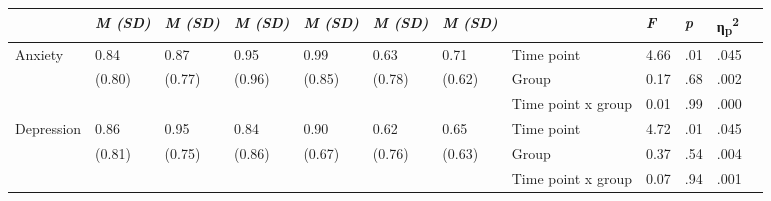\documentclass[authordate, empirical]{jote-new-article}
\begin{document}
\begin{table}[th!]
\begin{fullwidth}
{\begin{tabular}{@{} l l l l l l l | l l l l l @{}}
        \hline                                         & \emph{M (SD)}                                 & \emph{M (SD)}        & \emph{M (SD)}        & \emph{M (SD)} & \emph{M (SD)}
                                                       & \emph{M (SD)}                                 &                      & \emph{F}             & \emph{p}      & η\textsubscript{p}\textsuperscript{2}
        \\

        \hline   Anxiety                               & 0.84                                          & 0.87                 & 0.95                 & 0.99          & 0.63                                  & 0.71   & Time point         & 4.66 & .01  & .045 \\
                                                       & (0.80)                                        & (0.77)               & (0.96)               & (0.85)        & (0.78)                                & (0.62) & Group              & 0.17 & .68  & .002 \\
                                                       &                                               &                      &                      &               &                                       &        & Time point x group & 0.01 & .99  & .000 \\

        \hline Depression                              & 0.86                                          & 0.95                 & 0.84                 & 0.90          & 0.62                                  & 0.65   & Time point         & 4.72 & .01  & .045 \\
                                                       & (0.81)                                        & (0.75)               & (0.86)               & (0.67)        & (0.76)                                & (0.63) & Group              & 0.37 & .54  & .004 \\
                                                       &                                               &                      &                      &               &                                       &        & Time point x group & 0.07 & .94  & .001 \\


\end{tabular}}
\end{fullwidth}
\end{table}
\end{document}
